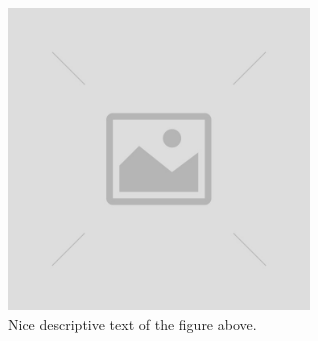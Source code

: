

\begin{figure}[!ht]
    \centering
    \captionsetup{justification=centering,margin=1cm}
    \includegraphics[width=80mm]{images/image-placeholder.jpg}
    \caption{Nice descriptive text of the figure above.}
    \label{fig:FigureLabel}
\end{figure}